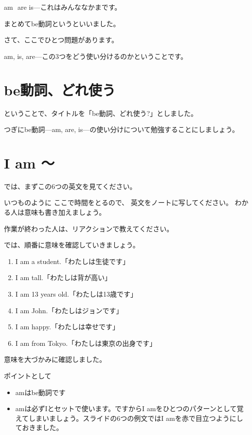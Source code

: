 \documentclass[book,jafontscale=0.9247]{jlreq}
\newcommand{\mySagyo}{%
\begin{minipage}[t]{.98\textwidth}
\mbox{}\hrulefill\mbox{}\par%
\mbox{}\hfill{}\raisebox{-5pt}{作業}\hfill\mbox{}\par%
\mbox{}\hrulefill\mbox{}
\end{minipage}%
\par%
\bigskip
}
\begin{document}
am\,\,\ComputerMouse\,\,are\,\,is---これはみんななかまです。

まとめてbe動詞というといいました。

さて、ここでひとつ問題があります。

am, is, are---この3つをどう使い分けるのかということです。

{\large \ComputerMouse}
\section{be動詞、どれ使う}

ということで、タイトルを「be動詞、どれ使う?」としました。

つぎにbe動詞---am, are, is---の使い分けについて勉強することにしましょう。

{\large \ComputerMouse}

\section{I am 〜}
{\large \ComputerMouse}

では、まずこの6つの英文を見てください。

いつものように
ここで時間をとるので、
英文をノートに写してください。
わかる人は意味も書き加えましょう。

作業が終わった人は、リアクションで教えてください。

\mySagyo

では、順番に意味を確認していきましょう。


\begin{enumerate}
 \item  I am a student.「わたしは生徒です」
 \item  I am tall.「わたしは背が高い」
 \item  I am 13 years old.「わたしは13歳です」
 \item  I am John.「わたしはジョンです」
 \item  I am happy.「わたしは幸せです」
 \item  I am from Tokyo.「わたしは東京の出身です」
\end{enumerate}

意味を大づかみに確認しました。

ポイントとして
\begin{itemize}
 \item amはbe動詞です
 \item amは必ずIとセットで使います。ですからI amをひとつのパターンとして覚えてしまいましょう。スライドの6つの例文ではI amを赤で目立つようにしておきました。
\end{itemize}
\end{document}
